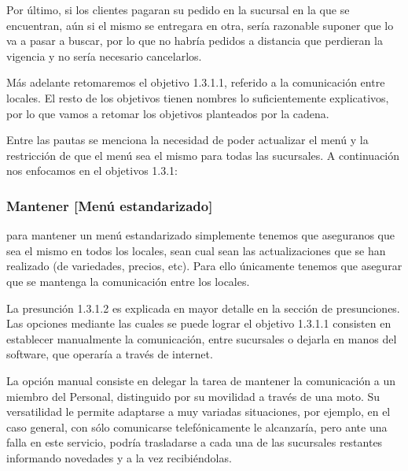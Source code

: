 \documentclass[a4paper,10pt]{article}
\begin{document}
Por último, si los clientes pagaran su pedido en la sucursal en la que se encuentran, aún si el mismo se entregara en otra, sería razonable suponer que lo va a pasar a buscar, por lo que no habría pedidos a distancia que perdieran la vigencia y no sería necesario cancelarlos.

Más adelante retomaremos el objetivo 1.3.1.1, referido a la comunicación entre locales.
El resto de los objetivos tienen nombres lo suficientemente explicativos, por lo que vamos a retomar los objetivos planteados por la cadena.

\begin{figure}[H]
\centering
{}
\caption{}
\end{figure}

Entre las pautas se menciona la necesidad de poder actualizar el menú y la restricción de que el menú sea el mismo para todas las sucursales. A continuación nos enfocamos en el objetivos 1.3.1:
\subsubsection*{Mantener [Menú estandarizado]}
para mantener un menú estandarizado simplemente tenemos que aseguranos que sea el mismo en todos los locales, sean cual sean las actualizaciones que se han realizado (de variedades, precios, etc). Para ello únicamente tenemos que asegurar que se mantenga la comunicación entre los locales. \\


\begin{figure}[H]
\centering
{}
\caption{}
\end{figure}

La presunción 1.3.1.2 es explicada en mayor detalle en la sección de presunciones.
Las opciones mediante las cuales se puede lograr el objetivo 1.3.1.1 consisten en establecer manualmente la comunicación, entre sucursales o dejarla en manos del software, que operaría a través de internet. 

La opción manual consiste en delegar la tarea de mantener la comunicación a un miembro del Personal, distinguido por su movilidad a través de una moto. Su versatilidad le permite adaptarse a muy variadas situaciones, por ejemplo, en el caso general, con sólo comunicarse telefónicamente le alcanzaría, pero ante una falla en este servicio, podría trasladarse a cada una de las sucursales restantes informando novedades y a la vez recibiéndolas. 
\end{document}
